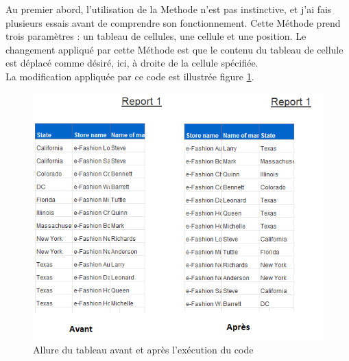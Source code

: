 Au premier abord, l'utilisation de la \gls{Methode}  n'est pas instinctive, et j'ai fais plusieurs essais avant de comprendre son fonctionnement. Cette M\'{e}thode prend trois param\`{e}tres : un tableau de cellules, une cellule et une position. Le changement appliqu\'{e} par cette M\'{e}thode est que le contenu du tableau de cellule est d\'{e}plac\'{e} comme d\'{e}sir\'{e}, ici, \`{a} droite de la cellule sp\'{e}cifi\'{e}e.\\
La modification appliqu\'{e}e par ce code est illustr\'{e}e figure \ref{figure:dropcells}.\\

\begin{figure}[!h]
  \centering
      \includegraphics{images/dropcells.png}
  \caption{Allure du tableau avant et apr\`{e}s l'ex\'{e}cution du code}
	\label{figure:dropcells}
\end{figure}





